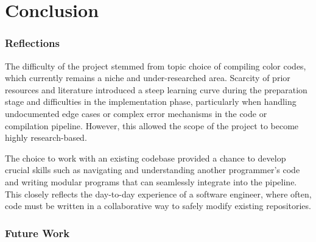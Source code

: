 \chapter{Conclusion}


\subsection{Reflections}


The difficulty of the project stemmed from topic choice of compiling color codes, which currently remains a niche and under-researched area. Scarcity of prior resources and literature introduced a steep learning curve during the preparation stage and difficulties in the implementation phase, particularly when handling undocumented edge cases or complex error mechanisms in the code or compilation pipeline.
However, this allowed the scope of the project to become highly research-based.

The choice to work with an existing codebase provided a chance to develop crucial skills such as navigating and understanding another programmer's code and writing modular programs that can seamlessly integrate into the pipeline. This closely reflects the day-to-day experience of a software engineer, where often, code must be written in a collaborative way to safely modify existing repositories.

\subsection{Future Work}
